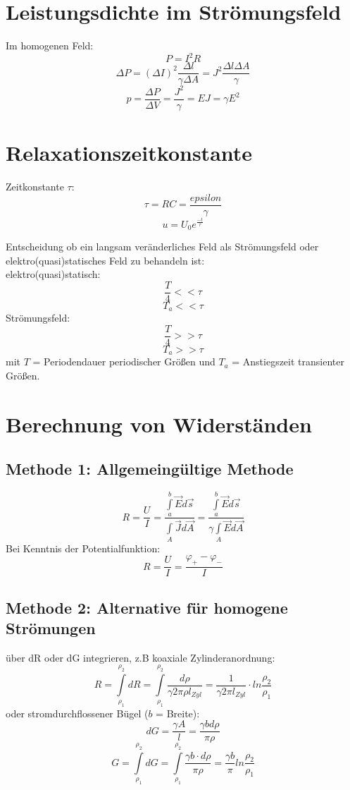 \documentclass[12pt,a4paper]{article}
\begin{document}
\section{Leistungsdichte im Strömungsfeld}
Im homogenen Feld:
\[P=I^2R\]
\[\Delta P = (\Delta I)^2\frac{\Delta l}{\gamma \Delta A} = J^2 \frac{\Delta l \Delta A}{\gamma}\]
\[p = \frac{\Delta P}{\Delta V} =\frac{J^2}{\gamma}=EJ =\gamma E^2\]

\section{Relaxationszeitkonstante}
Zeitkonstante $\tau$:
\[\tau = RC = \frac{epsilon}{\gamma}\]
\[u = U_0e^{\frac{-t}{\tau}}\]

Entscheidung ob ein langsam  veränderliches Feld als Strömungsfeld oder elektro(quasi)statisches Feld zu behandeln ist:\\
elektro(quasi)statisch:
\[\frac{T}{4}<< \tau\]
\[T_a << \tau\]
Strömungsfeld:
\[\frac{T}{4}>>\tau\]
\[T_a >> \tau\]
mit $T$ = Periodendauer periodischer Größen und $T_a$ = Anstiegszeit transienter Größen.

\section{Berechnung von Widerständen}
\subsection{Methode 1: Allgemeingültige Methode}
\[R=\frac{U}{I}= \frac{\int\limits_a^b{\vec{E}d\vec{s}}}{\int\limits_A{\vec{J}d\vec{A}}} =\frac{\int\limits_a^b{\vec{E}d\vec{s}}}{\gamma \int\limits_A{\vec{E}d\vec{A}}} \]
Bei Kenntnis der Potentialfunktion:
\[R=\frac{U}{I} = \frac{\varphi_+ - \varphi_-}{I}\]

\subsection{Methode 2: Alternative für homogene Strömungen}
über dR oder dG integrieren, z.B koaxiale Zylinderanordnung:
\[ R = \int\limits_{\rho_1}^{\rho_2}{dR} = \int\limits_{\rho_1}^{\rho_2}{\frac{d\rho}{\gamma 2 \pi \rho l_{Zyl}}} = \frac{1}{\gamma 2 \pi l_{Zyl}} \cdot ln\frac{\rho_2}{\rho_1}\]
oder stromdurchflossener Bügel ($b$ = Breite):
\[dG = \frac{\gamma A}{l} = \frac{\gamma bd\rho}{\pi \rho}\]
\[G = \int\limits_{\rho_1}^{\rho_2}{dG} = \int\limits_{\rho_1}^{\rho_2}{\frac{\gamma b\cdot d\rho}{\pi \rho}}= \frac{\gamma b}{\pi} ln\frac{\rho_2}{\rho_1}\]
\end{document}
